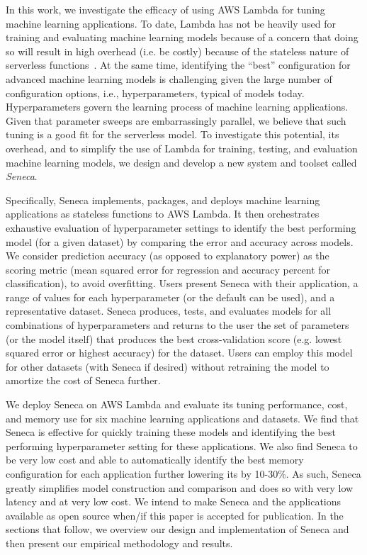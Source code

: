 In this work, we investigate the efficacy of using AWS Lambda
for tuning machine learning applications.
To date, Lambda has not be heavily used for training and evaluating
machine learning models because of a concern that 
doing so will result in high overhead (i.e. be costly) because
of the stateless nature of serverless functions~\cite{ref:onesteptwostep}.
At the same time, identifying the ``best'' configuration for advanced
machine learning models is challenging given the large number of configuration
options, i.e., hyperparameters, typical of models today.
Hyperparameters govern the learning process of machine learning applications.
Given that parameter sweeps are embarrassingly parallel, we believe
that such tuning is a good fit for the serverless model.
To investigate this potential, its overhead, and to simplify the 
use of Lambda for training, testing, and evaluation machine learning models, 
we design and develop a new system and toolset called \textit{Seneca}.

Specifically, Seneca implements, packages, and deploys 
machine learning applications as stateless functions to AWS Lambda.
It then orchestrates exhaustive evaluation of hyperparameter settings
to identify the best performing model (for a given dataset) by
comparing the error and accuracy across models.  We consider
prediction accuracy (as opposed to explanatory power) as the
scoring metric (mean squared error for regression 
and accuracy percent for classification), to avoid overfitting.
Users present Seneca with their application, a range of values for 
each hyperparameter (or the default can be used), and a representative dataset.
Seneca produces, tests, and evaluates models for all combinations 
of hyperparameters and returns to the user
the set of parameters (or the model itself) that produces
the best cross-validation score (e.g. lowest squared error or highest
accuracy) for the dataset. Users can employ this model for other datasets
(with Seneca if desired) without retraining the model to amortize the cost
of Seneca further.

We deploy Seneca on AWS Lambda and evaluate its tuning performance, cost,
and memory use for six machine learning applications and datasets. We 
find that Seneca is effective for quickly training these
models and identifying the best performing hyperparameter setting for 
these applications. We also find 
Seneca to be very low cost and able to automatically 
identify the 
best memory configuration for each application further lowering its 
by 10-30\%.
As such, Seneca greatly simplifies model construction and comparison and 
does so with very low latency and at very low cost.
We intend to make Seneca and the applications available as open source
when/if this paper is accepted for publication.  In the sections
that follow, we overview our design and implementation of Seneca and then
present our empirical methodology and results.


